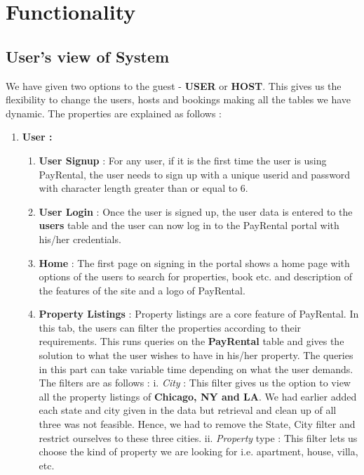 \documentclass[10pt]{article}
\begin{document}
\section{Functionality}
\subsection{User's view of System}
We have given two options to the guest - \textbf{USER} or \textbf{HOST}. This gives us the flexibility to change the users, hosts and bookings making all the tables we have dynamic. The properties are explained as follows :

\begin{enumerate}
	\item \textbf{User :} 
	\begin{enumerate}
	    \item \textbf{User Signup} : For any user, if it is the first time the user is using PayRental, the user needs to sign up with a unique userid and password with character length greater than or equal to 6. 
	    \item \textbf{User Login} : 
	    Once the user is signed up, the user data is entered to the \textbf{users} table and the user can now log in to the PayRental portal with his/her credentials.
	    \item \textbf{Home} : The first page on signing in the portal shows a home page with options of the users to search for properties, book etc. and description of the features of the site and a logo of PayRental. 
	    \item \textbf{Property Listings} : Property listings are a core feature of PayRental. In this tab, the users can filter the properties according to their requirements. This runs queries on the \textbf{PayRental} table and gives the solution to what the user wishes to have in his/her property. The queries in this part can take variable time depending on what the user demands. The filters are as follows : 
	    \newline
	    i. \textit{City} : 
	    \newline This filter gives us the option to view all the property listings of \textbf{Chicago, NY and LA}. We had earlier added each state and city given in the data but retrieval and clean up of all three was not feasible. Hence, we had to remove the State, City filter and restrict ourselves to these three cities.
	    \newline
	    ii. \textit{Property} type : \newline This filter lets us choose the kind of property we are looking for i.e. apartment, house, villa, etc. 

\end{enumerate}
\end{enumerate}
\end{document}
